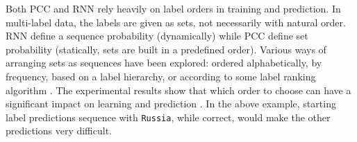 



 




Both PCC and RNN rely heavily on label orders in training and prediction. In multi-label data, the labels are given as sets, not necessarily with natural order.  RNN define a sequence probability (dynamically) while PCC define set probability (statically, sets are built in a predefined order). Various ways of arranging sets as sequences have been explored:  ordered alphabetically,  by frequency, based on a label hierarchy, or according to some label ranking algorithm \cite{liu2015optimality}. The experimental results show that which order to choose can have a significant impact on learning and prediction \cite{vinyals2015order,DBLP:conf/nips/NamMKF17,DBLP:conf/aaai/ChenCYW18}. In the above example, starting label predictions sequence with \texttt{Russia}, while correct, would make the other predictions very difficult.

